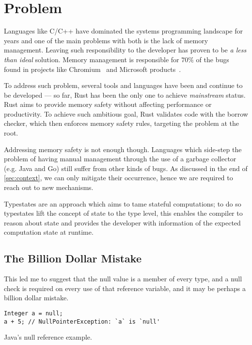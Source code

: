 \section{Problem}\label{sec:problem}

Languages like C/C++ have dominated the systems programming landscape for years and
one of the main problems with both is the lack of memory management.
Leaving such responsibility to the developer has proven to be \emph{a less than ideal} solution.
Memory management is responsible for $70\%$ of the bugs found in projects like Chromium~\autocite{chromium}
and Microsoft products~\autocite{Miller2019}.

To address such problem, several tools and languages have been and continue to be developed ---
so far, Rust has been the only one to achieve \emph{mainstream} status.
Rust aims to provide memory safety without affecting performance or productivity.
To achieve such ambitious goal, Rust validates code with the borrow checker, which then enforces memory safety rules,
targeting the problem at the root.

Addressing memory safety is not enough though.
Languages which side-step the problem of having manual management
through the use of a garbage collector (e.g. Java and Go) still suffer from other kinds of bugs.
As discussed in the end of \autoref{sec:context}, we can only mitigate their occurrence,
hence we are required to reach out to new mechanisms.

Typestates are an approach which aims to tame stateful computations;
to do so typestates lift the concept of state to the type level,
this enables the compiler to reason about state and provides the developer
with information of the expected computation state at runtime.

\subsection{The Billion Dollar Mistake}

\begin{displayquote}
    This led me to suggest that the null value is a member of every type,
    and a null check is required on every use of that reference variable,
    and it may be perhaps a billion dollar mistake.
\end{displayquote}

\begin{listing}
    \begin{verbatim}
Integer a = null;
a + 5; // NullPointerException: `a` is `null'
    \end{verbatim}
    \caption{Java's null reference example.}
    \label{lst:java-scanner-null}
\end{listing}


